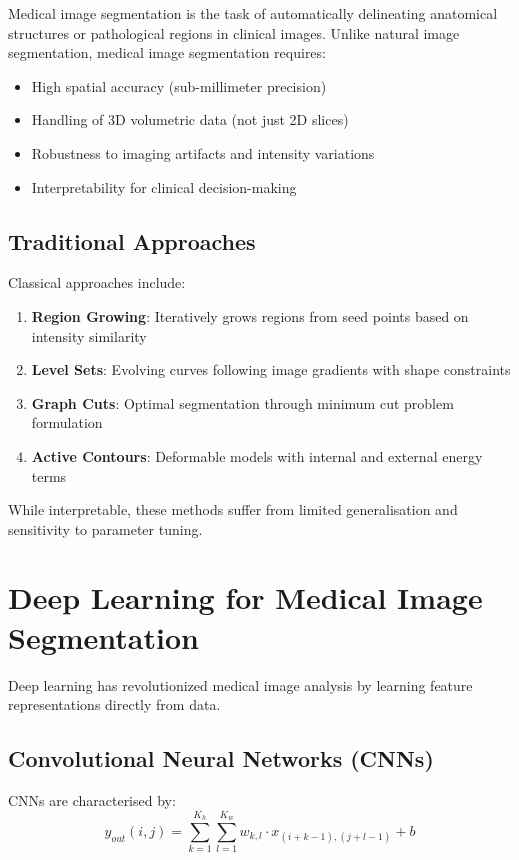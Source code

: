 \documentclass{ecsproject}     %
\begin{document}
Medical image segmentation is the task of automatically delineating anatomical structures or pathological regions in clinical images. Unlike natural image segmentation, medical image segmentation requires:

\begin{itemize}
    \item High spatial accuracy (sub-millimeter precision)
    \item Handling of 3D volumetric data (not just 2D slices)
    \item Robustness to imaging artifacts and intensity variations
    \item Interpretability for clinical decision-making
\end{itemize}

\subsection{Traditional Approaches}

Classical approaches include:
\begin{enumerate}
    \item \textbf{Region Growing}: Iteratively grows regions from seed points based on intensity similarity
    \item \textbf{Level Sets}: Evolving curves following image gradients with shape constraints
    \item \textbf{Graph Cuts}: Optimal segmentation through minimum cut problem formulation
    \item \textbf{Active Contours}: Deformable models with internal and external energy terms
\end{enumerate}

While interpretable, these methods suffer from limited generalisation and sensitivity to parameter tuning.

\section{Deep Learning for Medical Image Segmentation}

Deep learning has revolutionized medical image analysis by learning feature representations directly from data.

\subsection{Convolutional Neural Networks (CNNs)}

CNNs are characterised by:
\begin{equation}
y_{out}(i,j) = \sum_{k=1}^{K_h} \sum_{l=1}^{K_w} w_{k,l} \cdot x_{(i+k-1), (j+l-1)} + b
\end{equation}
\end{document}
